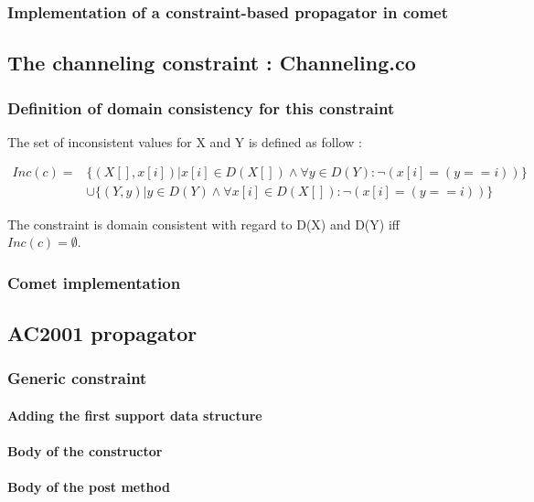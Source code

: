 \documentclass{eplDoc}
\begin{document}
\subsubsection{Implementation of a constraint-based propagator in comet}
\subsection{The channeling constraint : Channeling.co} %
\subsubsection{Definition of domain consistency for this constraint}
The set of inconsistent values for X and Y is defined as follow : 

\begin{align*}
Inc(c) = & \{(X[], x[i])|x[i] \in D(X[]) \wedge \forall y \in D(Y) : \neg(x[i]=(y==i))\} \\
 & \cup \{(Y, y)|y \in D(Y) \wedge \forall x[i] \in D(X[]) : \neg(x[i]=(y==i))\} 
\end{align*}

The constraint is domain consistent with regard to D(X) and D(Y) iff $Inc(c) = \emptyset$. 
\subsubsection{Comet implementation}

\subsection{AC2001 propagator} %

\subsubsection{Generic constraint}

\paragraph{Adding the first support data structure}

\paragraph{Body of the constructor}

\paragraph{Body of the post method}
\end{document}
